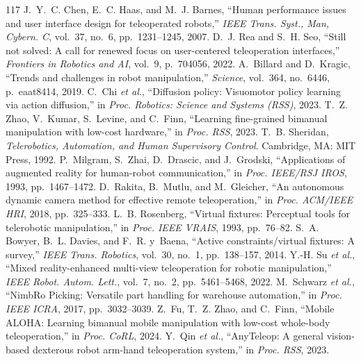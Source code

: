 \documentclass[10pt,journal]{IEEEtran}
\begin{document}
{\def\footnotesize{\fontsize{6.7pt}{7.5pt}\selectfont}
\setlength{\IEEEbibitemsep}{0pt}
\begin{thebibliography}{117}
 J.~Y.~C. Chen, E.~C. Haas, and M.~J. Barnes, ``Human performance issues and user interface design for teleoperated robots,'' \emph{IEEE Trans. Syst., Man, Cybern. C}, vol.~37, no.~6, pp.~1231--1245, 2007.
 D.~J. Rea and S.~H. Seo, ``Still not solved: A call for renewed focus on user-centered teleoperation interfaces,'' \emph{Frontiers in Robotics and AI}, vol.~9, p.~704056, 2022.
 A.~Billard and D.~Kragic, ``Trends and challenges in robot manipulation,'' \emph{Science}, vol.~364, no.~6446, p.~eaat8414, 2019.
 C.~Chi \emph{et al.}, ``Diffusion policy: Visuomotor policy learning via action diffusion,'' in \emph{Proc. Robotics: Science and Systems (RSS)}, 2023.
 T.~Z. Zhao, V.~Kumar, S.~Levine, and C.~Finn, ``Learning fine-grained bimanual manipulation with low-cost hardware,'' in \emph{Proc. RSS}, 2023.
 T.~B. Sheridan, \emph{Telerobotics, Automation, and Human Supervisory Control}. Cambridge, MA: MIT Press, 1992.
 P.~Milgram, S.~Zhai, D.~Drascic, and J.~Grodski, ``Applications of augmented reality for human-robot communication,'' in \emph{Proc. IEEE/RSJ IROS}, 1993, pp.~1467--1472.
 D.~Rakita, B.~Mutlu, and M.~Gleicher, ``An autonomous dynamic camera method for effective remote teleoperation,'' in \emph{Proc. ACM/IEEE HRI}, 2018, pp.~325--333.
 L.~B. Rosenberg, ``Virtual fixtures: Perceptual tools for telerobotic manipulation,'' in \emph{Proc. IEEE VRAIS}, 1993, pp.~76--82.
 S.~A. Bowyer, B.~L. Davies, and F.~R. y~Baena, ``Active constraints/virtual fixtures: A survey,'' \emph{IEEE Trans. Robotics}, vol.~30, no.~1, pp.~138--157, 2014.
 Y.-H. Su \emph{et al.}, ``Mixed reality-enhanced multi-view teleoperation for robotic manipulation,'' \emph{IEEE Robot. Autom. Lett.}, vol.~7, no.~2, pp.~5461--5468, 2022.
 M.~Schwarz \emph{et al.}, ``NimbRo Picking: Versatile part handling for warehouse automation,'' in \emph{Proc. IEEE ICRA}, 2017, pp.~3032--3039.
 Z.~Fu, T.~Z. Zhao, and C.~Finn, ``Mobile ALOHA: Learning bimanual mobile manipulation with low-cost whole-body teleoperation,'' in \emph{Proc. CoRL}, 2024.
 Y.~Qin \emph{et al.}, ``AnyTeleop: A general vision-based dexterous robot arm-hand teleoperation system,'' in \emph{Proc. RSS}, 2023.

\end{thebibliography}}
\end{document}
